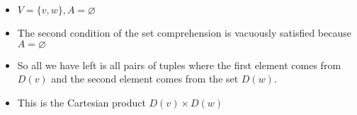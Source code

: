\begin{itemize}
    \item $V=\{v,w\}, A=\varnothing$
    \item The second condition of the set comprehension is vacuously satisfied because $A = \varnothing$
    \item So all we have left is all pairs of tuples where the first element comes from $D(v)$ and the second element comes from the set $D(w)$.
    \item This is the Cartesian product $D(v) \times D(w)$
  \end{itemize}
